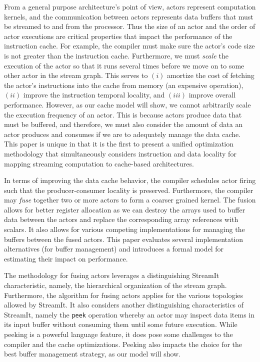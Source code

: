From a general purpose architecture's point of view, actors represent
computation kernels, and the communication between actors represents
data buffers that must be streamed to and from the processor. Thus
the size of an actor and the
order of actor executions are critical properties that
impact the performance of the instruction cache. For example, the
compiler must make sure the actor's code size is not
greater than the instruction cache. Furthermore, we must {\it scale}
the execution of the actor so that it runs several times before we move
on to some other actor in the stream 
graph. This serves to $(i)$ amortize the cost of fetching the actor's
instructions into the cache from memory (an expensive operation), $(ii)$
improve the instruction temporal locality, and $(iii)$ improve overall
performance. However, as our cache model will show, we 
cannot arbitrarily scale the execution frequency of an actor. This
is because actors produce data that must be buffered, and therefore,
we must also consider the amount of data an actor produces and
consumes if we are to adequately manage the data cache. This paper is unique
in that it is the first to present a unified optimization methodology
that simultaneously considers instruction and data locality for
mapping streaming computation to cache-based architectures.

In terms of improving the data cache behavior, the compiler schedules
actor firing such that the producer-consumer locality is
preserved. Furthermore,  the compiler may {\it fuse}
together two or more actors to form a coarser grained kernel.
The fusion allows for better register allocation as we can
destroy the arrays used to buffer data between the actors and replace
the corresponding array references with scalars.  It also allows for
various competing implementations for managing the buffers between the
fused actors.  This paper evaluates several implementation
alternatives (for buffer management) and introduces a formal model for
estimating their impact on performance.

The methodology for fusing actors leverages a distinguishing StreamIt
characteristic, namely, the hierarchical organization of
the stream graph. Furthermore, the algorithm for fusing actors applies
for the various topologies allowed by StreamIt.
It also considers another distinguishing characteristics of StreamIt,
namely the {\tt peek} operation whereby an actor may inspect data
items in its input buffer without consuming them until some future
execution. While peeking is a powerful language feature, it does pose
some challenges to the compiler and the cache optimizations. Peeking
also impacts the choice for the best buffer management strategy, as our
model will show.

